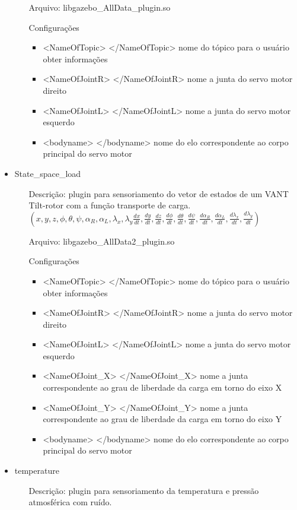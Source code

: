 \begin{itemize}
\begin{itemize}
\item[Arquivo:] libgazebo\_AllData\_plugin.so
\item[Configurações]
\begin{itemize}
\item <NameOfTopic> </NameOfTopic> nome do tópico para o usuário obter informações
\item <NameOfJointR> </NameOfJointR> nome a junta do servo motor direito
\item <NameOfJointL> </NameOfJointL> nome a junta do servo motor esquerdo
\item <bodyname> </bodyname> nome do elo correspondente ao corpo principal do servo motor
\end{itemize}
\end{itemize}
\item State\_space\_load
\begin{itemize}
\item[Descrição:] plugin para sensoriamento do vetor de estados de um VANT Tilt-rotor com a função transporte de carga.  \\ $(x,y,z,\phi,\theta,\psi,\alpha_R,\alpha_L,\lambda_x,\lambda_y
\frac{dx}{dt},\frac{dy}{dt},\frac{dz}{dt},\frac{d\phi}{dt},\frac{d\theta}{dt},\frac{d\psi}{dt},\frac{d\alpha_R}{dt},\frac{d\alpha_L}{dt},\frac{d\lambda_x}{dt},\frac{d\lambda_y}{dt})$
\item[Arquivo:] libgazebo\_AllData2\_plugin.so
\item[Configurações]
\begin{itemize}
\item <NameOfTopic> </NameOfTopic> nome do tópico para o usuário obter informações
\item <NameOfJointR> </NameOfJointR> nome a junta do servo motor direito
\item <NameOfJointL> </NameOfJointL> nome a junta do servo motor esquerdo
\item <NameOfJoint\_X> </NameOfJoint\_X> nome a junta correspondente ao grau de liberdade da carga em torno do eixo X
\item <NameOfJoint\_Y> </NameOfJoint\_Y> nome a junta correspondente ao grau de liberdade da carga em torno do eixo Y
\item <bodyname> </bodyname> nome do elo correspondente ao corpo principal do servo motor
\end{itemize}
\end{itemize}
\item temperature
\begin{itemize}
\item[Descrição:] plugin para sensoriamento da temperatura e pressão atmosférica com ruído. \\ 

\end{itemize}
\end{itemize}
